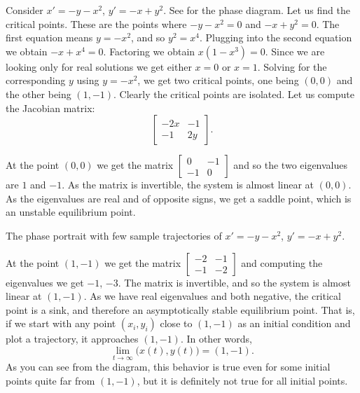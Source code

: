 \begin{example} \label{example:nlin-xplusy}
Consider
$x'=-y-x^2$,
$y'=-x+y^2$.
See  for the phase diagram.
Let us find the critical points.  These are the points where
$-y-x^2 = 0$ and $-x+y^2=0$.  The first equation means $y = -x^2$, and
so $y^2 = x^4$.  Plugging into the second equation we obtain 
$-x+x^4 = 0$.  Factoring we obtain $x(1-x^3)=0$.  Since we are looking only
for real solutions we get either $x=0$ or $x=1$.  Solving for the
corresponding $y$ using $y = -x^2$, we get two critical points, one being $(0,0)$
and the other being $(1,-1)$.  Clearly the critical points are isolated.
Let us compute the Jacobian matrix:
\begin{equation*}
\begin{bmatrix}
-2x & -1 \\
-1 & 2y
\end{bmatrix} .
\end{equation*}

At the point $(0,0)$ we get the matrix
$\left[ \begin{smallmatrix} 0 & -1 \\ -1 & 0 \end{smallmatrix} \right]$ and
so the two eigenvalues are $1$ and $-1$.  As the matrix is invertible, the system is almost linear
at $(0,0)$.  As the eigenvalues are real
and of opposite signs, we get a saddle point, which is an unstable
equilibrium point.

\begin{myfig}
\capstart
{}
\caption{The phase portrait with few sample trajectories of 
$x'=-y-x^2$, $y'=-x+y^2$.  \label{fig:nlin-ex813-new}}
\end{myfig}
At the point $(1,-1)$ we get the matrix
$\left[ \begin{smallmatrix} -2 & -1 \\ -1 & -2 \end{smallmatrix} \right]$ and
computing the eigenvalues we get $-1$, $-3$.
The matrix is invertible, and so the system is almost linear at $(1,-1)$.
As we have real eigenvalues and both negative, the critical
point is a sink, and therefore an asymptotically stable equilibrium point.
That is, if we start with any point $(x_i,y_i)$ close to $(1,-1)$ as
an initial condition and plot a trajectory, it approaches $(1,-1)$.
In other words,
\begin{equation*}
\lim_{t \to \infty} \bigl( x(t), y(t) \bigr) = (1,-1) .
\end{equation*}
As you can 
see from the diagram, this behavior is true even for some
initial points quite far from $(1,-1)$, but it is definitely not true for all
initial points.
\end{example}


